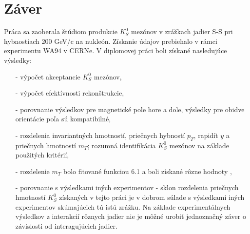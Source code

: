  \chapter{Záver}
Práca sa zaoberala štúdiom produkcie $K^{0}_{S}$ mezónov v zrážkach jadier
 S-S pri hybnostiach 200 GeV/c na nukleón. Získanie  údajov prebiehalo v
rámci experimentu WA94 v CERNe. 
% 
V diplomovej práci boli získané nasledujúce výsledky:
\begin{itemize}
  \item[-] výpočet akceptancie $K^{0}_{S}$ mezónov,
  \item[-] výpočet efektívnosti rekonštrukcie,
  \item[-] porovnanie výsledkov pre magnetické pole hore a dole, výsledky
pre obidve orientácie poľa sú kompatibilné,

  \item[-] rozdelenia invariantných hmotností, priečnych hybností $p_{T}$,
   rapidít $y$ a prie\-čnych hmotností $m_{T}$;  rozumná identifikácia
   $K^{0}_{S}$ mezónov na základe použitých kritérií,
  \item[-] rozdelenie $m_{T}$ bolo fitované funkciou 6.1 a boli získané 
   rôzne hodnoty ,
  \item[-] porovnanie s výsledkami iných experimentov - sklon rozdelenia
priečnych hmotností $K^{0}_{S}$ získaných v tejto práci je v dobrom súlade
s výsledkami iných experimentov skúmajúcich tú istú zrážku. Na základe
experimentálnych výsledkov z interakcií rôznych jadier nie je môžné urobiť
jednoznačný záver o závislosti  od interagujúcich jadier.  
\end{itemize}


%
%